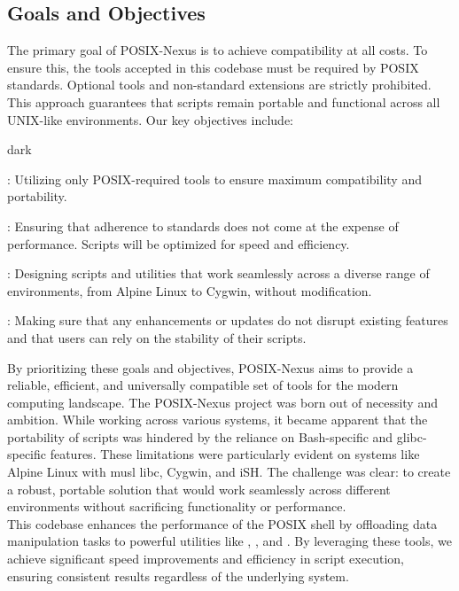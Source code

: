 \subsection{Goals and Objectives}
\label{sec:introduction:sub:goal}
The primary goal of POSIX-Nexus is to achieve compatibility at all costs.
To ensure this, the tools accepted in this codebase must be required by POSIX standards.
Optional tools and non-standard extensions are strictly prohibited.
This approach guarantees that scripts remain portable and functional across all UNIX-like environments.
Our key objectives include:
\bigskip
\begin{baseBoxOne}{}{dark}
    \begin{posnexItemize}
        \item[\sA] : Utilizing only POSIX-required tools to ensure maximum compatibility and portability. 
        \item[\sA] : Ensuring that adherence to standards does not come at the expense of performance. Scripts will be optimized for speed and efficiency. 
        \item[\sA] : Designing scripts and utilities that work seamlessly across a diverse range of environments, from Alpine Linux to Cygwin, without modification. 
        \item[\sA] : Making sure that any enhancements or updates do not disrupt existing features and that users can rely on the stability of their scripts. 
    \end{posnexItemize}
\end{baseBoxOne}
\bigskip
By prioritizing these goals and objectives, POSIX-Nexus aims to provide a reliable, efficient, and universally compatible set of tools for the modern computing landscape.
The POSIX-Nexus project was born out of necessity and ambition.
While working across various systems, it became apparent that the portability of scripts was hindered by the reliance on Bash-specific and glibc-specific features.
These limitations were particularly evident on systems like Alpine Linux with musl libc, Cygwin, and iSH.
The challenge was clear: to create a robust, portable solution that would work seamlessly across different environments without sacrificing functionality or performance.
\\

This codebase enhances the performance of the POSIX shell by offloading data manipulation tasks to powerful utilities like , , and .
By leveraging these tools, we achieve significant speed improvements and efficiency in script execution, ensuring consistent results regardless of the underlying system.

